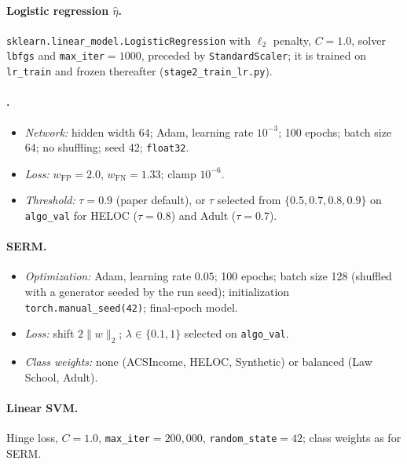 \paragraph{Logistic regression $\widehat{\eta}$.}
\texttt{sklearn.linear\_model.LogisticRegression} with $\ell_2$ penalty,
$C=1.0$, solver \texttt{lbfgs} and \texttt{max\_iter}$=1000$, preceded by
\texttt{StandardScaler}; it is trained on \texttt{lr\_train} and frozen
thereafter (\texttt{stage2\_train\_lr.py}).

\paragraph{\citet{attias2025pac}.}
\begin{itemize}
  \item \emph{Network:} hidden width 64; Adam, learning rate $10^{-3}$; 100
        epochs; batch size 64; no shuffling; seed 42; \texttt{float32}.
  \item \emph{Loss:} $w_{\mathrm{FP}}=2.0$, $w_{\mathrm{FN}}=1.33$; clamp
        $10^{-6}$.
  \item \emph{Threshold:} $\tau=0.9$ (paper default), or $\tau$ selected from
        $\{0.5,0.7,0.8,0.9\}$ on \texttt{algo\_val} for HELOC ($\tau=0.8$) and
        Adult ($\tau=0.7$).
\end{itemize}

\paragraph{\textsc{SERM}.}
\begin{itemize}
  \item \emph{Optimization:} Adam, learning rate $0.05$; 100 epochs; batch
        size 128 (shuffled with a generator seeded by the run seed);
        initialization \texttt{torch.manual\_seed(42)}; final-epoch model.
  \item \emph{Loss:} shift $2\|w\|_2$; $\lambda\in\{0.1,1\}$ selected on
        \texttt{algo\_val}.
  \item \emph{Class weights:} none (ACSIncome, HELOC, Synthetic) or balanced
        (Law School, Adult).
\end{itemize}

\paragraph{Linear SVM.}
Hinge loss, $C=1.0$, \texttt{max\_iter}$=200{,}000$, \texttt{random\_state}$=42$;
class weights as for \textsc{SERM}.

